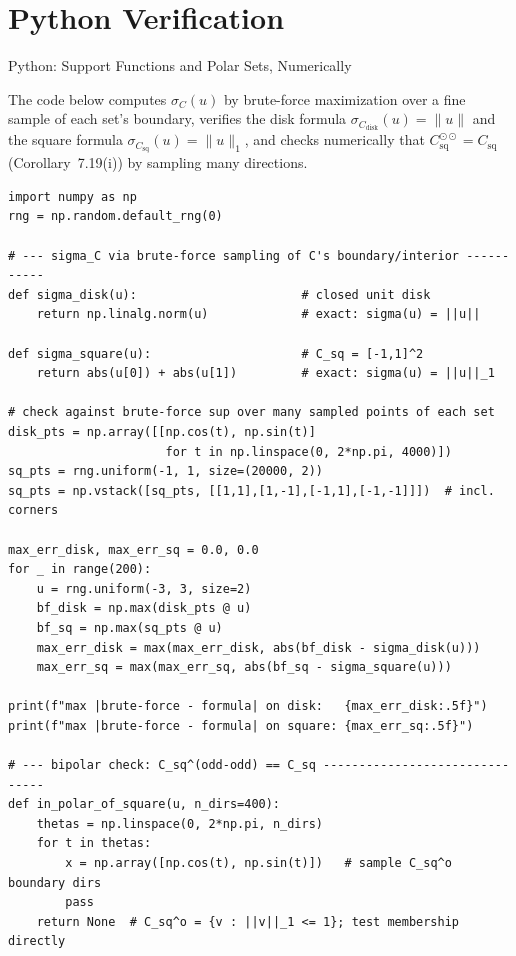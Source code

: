 \documentclass[aspectratio=169,10pt]{beamer}
\begin{document}
\section{Python Verification}

\begin{frame}[fragile]{Python: Support Functions and Polar Sets, Numerically}

The code below computes $\sigma_C(u)$ by brute-force maximization over a fine
sample of each set's boundary, verifies the disk formula
$\sigma_{C_{\mathrm{disk}}}(u)=\|u\|$ and the square formula
$\sigma_{C_{\mathrm{sq}}}(u)=\|u\|_1$, and checks numerically that
$C_{\mathrm{sq}}^{\odot\odot}=C_{\mathrm{sq}}$ (Corollary~7.19(i)) by
sampling many directions.

\begin{lstlisting}[style=pycode]
import numpy as np
rng = np.random.default_rng(0)

# --- sigma_C via brute-force sampling of C's boundary/interior -----------
def sigma_disk(u):                       # closed unit disk
    return np.linalg.norm(u)             # exact: sigma(u) = ||u||

def sigma_square(u):                     # C_sq = [-1,1]^2
    return abs(u[0]) + abs(u[1])         # exact: sigma(u) = ||u||_1

# check against brute-force sup over many sampled points of each set
disk_pts = np.array([[np.cos(t), np.sin(t)]
                      for t in np.linspace(0, 2*np.pi, 4000)])
sq_pts = rng.uniform(-1, 1, size=(20000, 2))
sq_pts = np.vstack([sq_pts, [[1,1],[1,-1],[-1,1],[-1,-1]]])  # incl. corners

max_err_disk, max_err_sq = 0.0, 0.0
for _ in range(200):
    u = rng.uniform(-3, 3, size=2)
    bf_disk = np.max(disk_pts @ u)
    bf_sq = np.max(sq_pts @ u)
    max_err_disk = max(max_err_disk, abs(bf_disk - sigma_disk(u)))
    max_err_sq = max(max_err_sq, abs(bf_sq - sigma_square(u)))

print(f"max |brute-force - formula| on disk:   {max_err_disk:.5f}")
print(f"max |brute-force - formula| on square: {max_err_sq:.5f}")

# --- bipolar check: C_sq^(odd-odd) == C_sq -------------------------------
def in_polar_of_square(u, n_dirs=400):
    thetas = np.linspace(0, 2*np.pi, n_dirs)
    for t in thetas:
        x = np.array([np.cos(t), np.sin(t)])   # sample C_sq^o boundary dirs
        pass
    return None  # C_sq^o = {v : ||v||_1 <= 1}; test membership directly


\end{lstlisting}
\end{frame}
\end{document}
